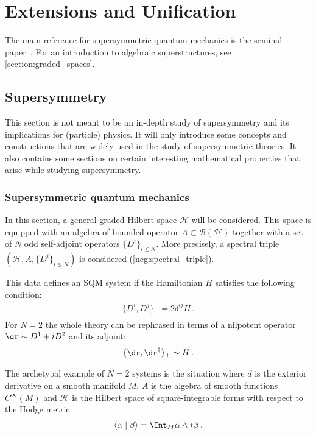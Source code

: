 \chapter{Extensions and Unification}\label{chapter:unification}

    The main reference for supersymmetric quantum mechanics is the seminal paper~\citet{witten_supersymmetry_1982}. For an introduction to algebraic superstructures, see \cref{section:graded_spaces}.

\section{Supersymmetry}

    This section is not meant to be an in-depth study of supersymmetry and its implications for (particle) physics. It will only introduce some concepts and constructions that are widely used in the study of supersymmetric theories. It also contains some sections on certain interesting mathematical properties that arise while studying supersymmetry.

\subsection{Supersymmetric quantum mechanics}

    In this section, a general graded Hilbert space $\mathcal{H}$ will be considered. This space is equipped with an algebra of bounded operator $A\subset\mathcal{B}(\mathcal{H})$ together with a set of $N$ odd self-adjoint operators $\{D^i\}_{i\leq N}$. More precisely, a spectral triple $(\mathcal{H},A,\{D^i\}_{i\leq N})$ is considered (\cref{ncg:spectral_triple}).

    This data defines an SQM system if the Hamiltonian $H$ satisfies the following condition:
    \begin{gather}
        \{D^i,D^j\}_+ = 2\delta^{ij}H\,.
    \end{gather}
    For $N=2$ the whole theory can be rephrased in terms of a nilpotent operator $\dr\sim D^1+iD^2$ and its adjoint:
    \begin{gather}
        \{\dr,\dr^\dagger\}_+\sim H\,.
    \end{gather}

    \begin{example}
        The archetypal example of $N=2$ systems is the situation where $d$ is the exterior derivative on a smooth manifold $M$, $A$ is the algebra of smooth functions $C^\infty(M)$ and $\mathcal{H}$ is the Hilbert space of square-integrable forms with respect to the Hodge metric
        \begin{gather}
            \langle\alpha\mid\beta\rangle = \Int_M\alpha\wedge\ast\beta\,.
        \end{gather}
    \end{example}


